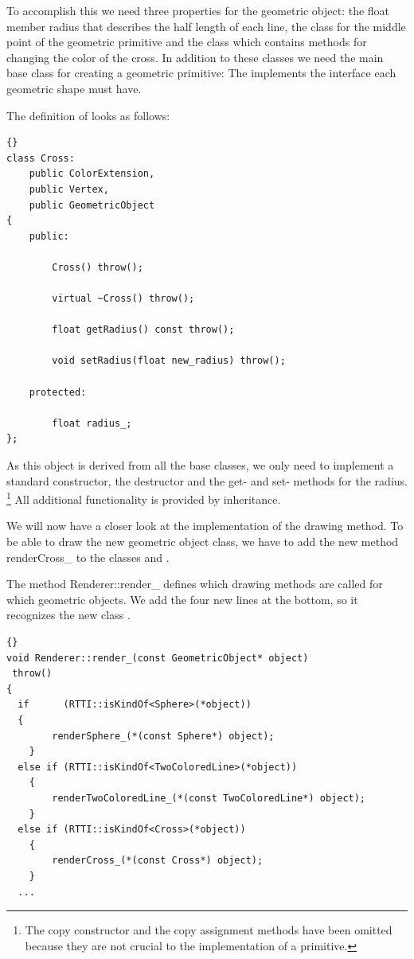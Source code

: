 To accomplish this we need three properties for the geometric object: the
float member radius that describes the half length of each line, the class 
 for the middle point of the geometric primitive and the class 
 which contains methods for changing the color of the
cross. In addition to these classes we need the main base class for
creating a geometric primitive: The  
implements the interface each geometric shape must have.

The definition of  looks as follows:
\begin{lstlisting}{}
class Cross: 
	public ColorExtension,
	public Vertex,
	public GeometricObject
{
	public:

		Cross() throw();

		virtual ~Cross() throw();
		
		float getRadius() const throw();

		void setRadius(float new_radius) throw();

	protected:
					
		float radius_;
};
\end{lstlisting}

As this object is derived from all the base classes, we only need to implement
a standard constructor, the destructor and the get- and set- methods for 
the radius.
\footnote{The copy constructor and the copy assignment methods
have been omitted because they are not crucial to the implementation of a
primitive.} All additional functionality is provided by inheritance.

We will now have a closer look at the implementation of the drawing method. 
To be able to draw the new geometric object class, we have to add the new
method renderCross\_ to the classes  and .

The method Renderer::render\_ defines which drawing methods are called for
which geometric objects. We add the four new lines at the bottom, 
so it recognizes the new class .

\begin{lstlisting}{}
void Renderer::render_(const GeometricObject* object)
 throw()
{
  if      (RTTI::isKindOf<Sphere>(*object))         
  { 
		renderSphere_(*(const Sphere*) object);
	}
  else if (RTTI::isKindOf<TwoColoredLine>(*object)) 
	{ 
		renderTwoColoredLine_(*(const TwoColoredLine*) object);
	}
  else if (RTTI::isKindOf<Cross>(*object))          
	{ 
		renderCross_(*(const Cross*) object);
	}
  ...
\end{lstlisting}

